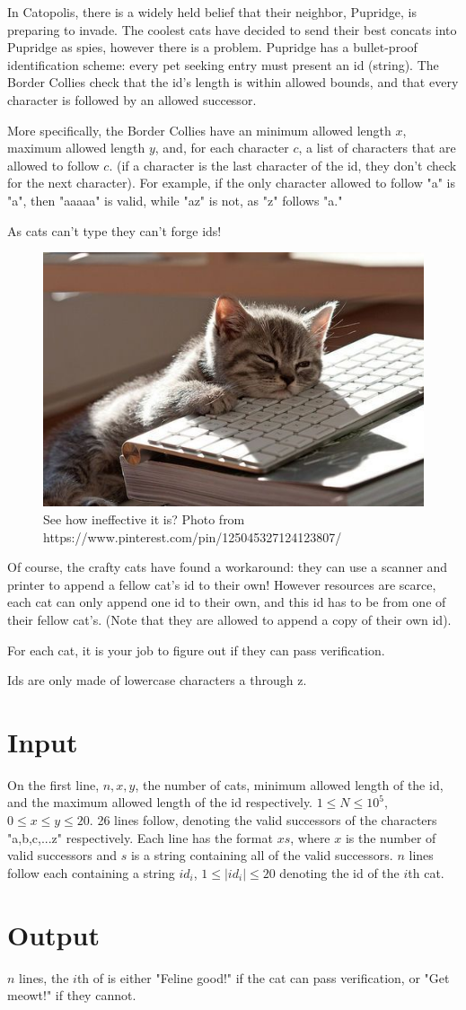 
In Catopolis, there is a widely held belief that their neighbor, Pupridge, is preparing to invade. The coolest cats have decided to send their best concats into Pupridge as spies, however there is a problem. Pupridge has a bullet-proof identification scheme: every pet seeking entry must present an id (string). The Border Collies check that the id's length is within allowed bounds, and that every character is followed by an allowed successor. 

More specifically, the Border Collies have an minimum allowed length $x$, maximum allowed length $y$, and, for each character $c$, a list of characters that are allowed to follow $c$. (if a character is the last character of the id, they don't check for the next character). For example, if the only character allowed to follow "a" is "a", then "aaaaa" is valid, while "az" is not, as "z" follows "a."

As cats can't type they can't forge ids!

\begin{figure}[h]
	\begin{center}
	\includegraphics[height=0.3\textwidth]{catkeyboard}
	\caption{See how ineffective it is? Photo from https://www.pinterest.com/pin/125045327124123807/}
	\end{center}
\end{figure}

\medskip

Of course, the crafty cats have found a workaround: they can use a scanner and printer to append a fellow cat's id to their own! However resources are scarce, each cat can only append one id to their own, and this id has to be from one of their fellow cat's. (Note that they are allowed to append a copy of their own id).

\medskip

For each cat, it is your job to figure out if they can pass verification.

Ids are only made of lowercase characters a through z.

\section*{Input}
On the first line, $n, x, y$, the number of cats, minimum allowed length of the id, and the maximum allowed length of the id respectively. $1 \leq N \leq 10^5$, $0 \leq x \leq y \leq 20$.
26 lines follow, denoting the valid successors of the characters "a,b,c,...z" respectively. Each line has the format $x s$, where $x$ is the number of valid successors and $s$ is a string containing all of the valid successors.
$n$ lines follow each containing a string $id_i$, $1 \leq |id_i| \leq 20$ denoting the id of the $i$th cat.

\section*{Output}
$n$ lines, the $i$th of is either "Feline good!" if the cat can pass verification, or "Get meowt!" if they cannot.
